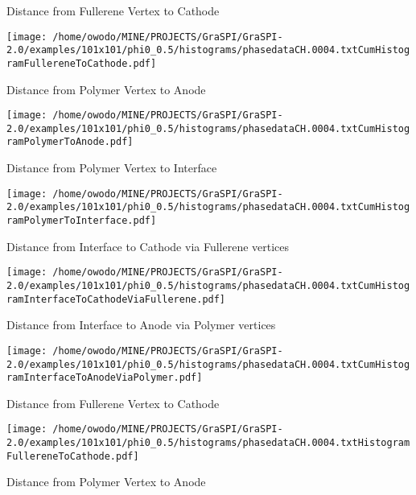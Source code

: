 \documentclass{article}
\begin{document}
\begin{center}
\parbox{0.33\textwidth}{\begin{scriptsize}Distance from Fullerene Vertex to Cathode\end{scriptsize}\newline
\texttt{[image: /home/owodo/MINE/PROJECTS/GraSPI/GraSPI-2.0/examples/101x101/phi0\_0.5/histograms/phasedataCH.0004.txtCumHistogramFullereneToCathode.pdf]}} 
\parbox{0.33\textwidth}{\begin{scriptsize}Distance from Polymer Vertex to Anode\end{scriptsize}\newline
\texttt{[image: /home/owodo/MINE/PROJECTS/GraSPI/GraSPI-2.0/examples/101x101/phi0\_0.5/histograms/phasedataCH.0004.txtCumHistogramPolymerToAnode.pdf]}}
\parbox{0.33\textwidth}{\begin{scriptsize}Distance from Polymer Vertex to Interface\end{scriptsize}\newline
\texttt{[image: /home/owodo/MINE/PROJECTS/GraSPI/GraSPI-2.0/examples/101x101/phi0\_0.5/histograms/phasedataCH.0004.txtCumHistogramPolymerToInterface.pdf]}} \newline
\parbox{0.49\textwidth}{\begin{scriptsize}Distance from Interface to Cathode via Fullerene vertices \end{scriptsize}\newline
\texttt{[image: /home/owodo/MINE/PROJECTS/GraSPI/GraSPI-2.0/examples/101x101/phi0\_0.5/histograms/phasedataCH.0004.txtCumHistogramInterfaceToCathodeViaFullerene.pdf]}}
\parbox{0.49\textwidth}{\begin{scriptsize}Distance from Interface to Anode via Polymer vertices \end{scriptsize}\newline
\texttt{[image: /home/owodo/MINE/PROJECTS/GraSPI/GraSPI-2.0/examples/101x101/phi0\_0.5/histograms/phasedataCH.0004.txtCumHistogramInterfaceToAnodeViaPolymer.pdf]}}
\parbox{0.33\textwidth}{\begin{scriptsize}Distance from Fullerene Vertex to Cathode\end{scriptsize}\newline
\texttt{[image: /home/owodo/MINE/PROJECTS/GraSPI/GraSPI-2.0/examples/101x101/phi0\_0.5/histograms/phasedataCH.0004.txtHistogramFullereneToCathode.pdf]}} 
\parbox{0.33\textwidth}{\begin{scriptsize}Distance from Polymer Vertex to Anode\end{scriptsize}\newline
}
\end{center}
\end{document}
